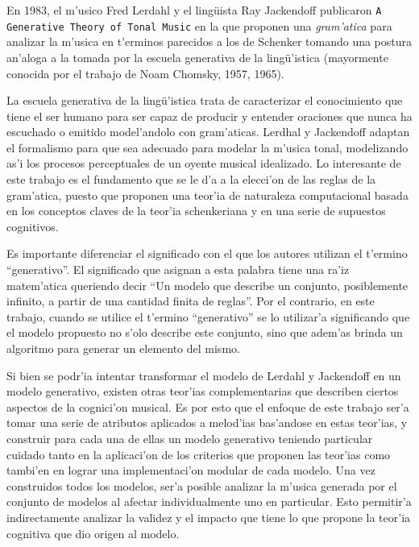 %

En 1983, el m'usico Fred Lerdahl y el ling\"uista Ray Jackendoff publicaron 
\texttt{A Generative Theory of Tonal Music} \citep{LerdahlJackendoff83} en la que proponen una \emph{gram'atica} para analizar la m'usica en 
t'erminos parecidos a los de Schenker tomando una postura an'aloga a la tomada por la escuela generativa de la ling\"u'istica 
(mayormente conocida por el trabajo de Noam Chomsky, 1957, 1965). 

La escuela generativa de la ling\"u'istica trata de caracterizar el conocimiento que tiene el ser humano para ser capaz de producir y entender oraciones 
que nunca ha escuchado o emitido model'andolo con gram'aticas. Lerdhal y Jackendoff adaptan el formalismo para que sea adecuado para modelar 
la m'usica tonal, modelizando as'i los procesos perceptuales de un oyente musical idealizado. 
Lo interesante de este trabajo es el fundamento que se le d'a a la elecci'on de las reglas de la gram'atica, puesto que proponen una teor'ia 
de naturaleza computacional basada en los conceptos claves de la teor'ia schenkeriana y en una serie de supuestos cognitivos. 

Es importante diferenciar el significado con el que los autores utilizan el t'ermino ``generativo''\citep[p. 6]{LerdahlJackendoff83}. El significado que asignan 
a esta palabra tiene una ra'iz matem'atica queriendo decir ``Un modelo que describe un conjunto, posiblemente infinito, a partir
de una cantidad finita de reglas''. Por el contrario, en este trabajo, cuando se utilice el t'ermino ``generativo'' se lo utilizar'a significando 
que el modelo propuesto no s'olo describe este conjunto, sino que adem'as brinda un algoritmo para generar un elemento del mismo.

Si bien se podr'ia intentar transformar el modelo de Lerdahl y Jackendoff en un modelo generativo, existen otras teor'ias complementarias que describen
ciertos aspectos de la cognici'on musical. Es por esto que el enfoque de este trabajo ser'a tomar una serie de atributos aplicados a melod'ias 
bas'andose en estas teor'ias, 
y construir para cada una de ellas un modelo generativo teniendo particular cuidado
tanto en la aplicaci'on de los criterios que proponen las teor'ias como tambi'en en lograr una implementaci'on modular de cada modelo. 
Una vez construidos todos los modelos, ser'a posible analizar la m'usica generada por el conjunto de modelos al afectar individualmente uno en particular. Esto
permitir'a indirectamente analizar la validez y el impacto que tiene lo que propone la teor'ia cognitiva que dio origen al modelo.

